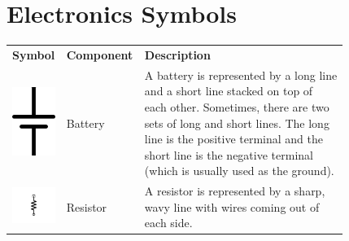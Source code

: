 \chapter{Electronics Symbols}
\label{appendixSymbols}

\begin{center}
\begin{tabular}{M{0.1\linewidth} | M{0.12\linewidth} | m{0.6\linewidth}}
\textbf{Symbol} & \textbf{Component} & \textbf{Description} \\
\includegraphics[scale=0.125]{BatterySymbol.png} & Battery & A battery is represented by a long line and a short line stacked on top of each other.  Sometimes, there are two sets of long and short lines.  The long line is the positive terminal and the short line is the negative terminal (which is usually used as the ground). \\ \hline
\includegraphics[scale=0.25]{ResistorSymbol.pdf} & Resistor & A resistor is represented by a sharp, wavy line with wires coming out of each side. \\ \hline

\end{tabular}
\end{center}
